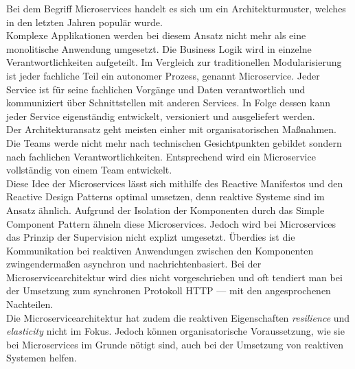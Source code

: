 Bei dem Begriff Microservices handelt es sich um ein Architekturmuster, welches in den letzten Jahren populär wurde.\\
Komplexe Applikationen werden bei diesem Ansatz nicht mehr als eine monolitische Anwendung umgesetzt. Die Business Logik wird in einzelne Verantwortlichkeiten aufgeteilt. Im Vergleich zur traditionellen Modularisierung ist jeder fachliche Teil ein autonomer Prozess, genannt Microservice. Jeder Service ist für seine fachlichen Vorgänge und Daten verantwortlich und kommuniziert über Schnittstellen mit anderen Services. In Folge dessen kann jeder Service eigenständig entwickelt, versioniert und ausgeliefert werden.\\
Der Architekturansatz geht meisten einher mit organisatorischen Maßnahmen. Die Teams werde nicht mehr nach technischen Gesichtpunkten gebildet sondern nach fachlichen Verantwortlichkeiten. Entsprechend wird ein Microservice vollständig von einem Team entwickelt.\\

Diese Idee der Microservices lässt sich mithilfe des Reactive Manifestos und den Reactive Design Patterns optimal umsetzen, denn reaktive Systeme sind im Ansatz ähnlich. Aufgrund der Isolation der Komponenten durch das Simple Component Pattern ähneln diese Microservices. Jedoch wird bei Microservices das Prinzip der Supervision nicht explizt umgesetzt. Überdies ist die Kommunikation bei reaktiven Anwendungen zwischen den Komponenten zwingendermaßen asynchron und nachrichtenbasiert. Bei der Microservicearchitektur wird dies nicht vorgeschrieben und oft tendiert man bei der Umsetzung zum synchronen Protokoll HTTP --- mit den angesprochenen Nachteilen.\\
Die Microservicearchitektur hat zudem die reaktiven Eigenschaften \textit{resilience} und \textit{elasticity} nicht im Fokus. Jedoch können organisatorische Voraussetzung, wie sie bei Microservices im Grunde nötigt sind, auch bei der Umsetzung von reaktiven Systemen helfen.



